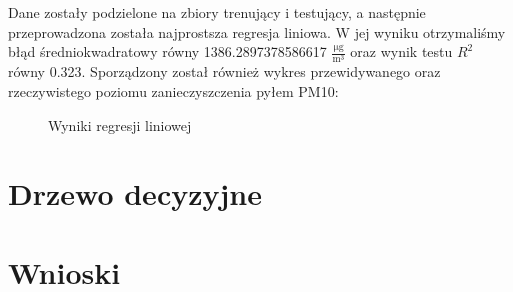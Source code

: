 \documentclass{article}
\begin{document}
	Dane zostały podzielone na zbiory trenujący i testujący, a następnie przeprowadzona została najprostsza regresja liniowa. W jej wyniku otrzymaliśmy błąd średniokwadratowy równy 1386.2897378586617 $\frac{\si{\micro\gram}}{\si\meter^3}$ oraz wynik testu $R^2$ równy 0.323. Sporządzony został również wykres przewidywanego oraz rzeczywistego poziomu zanieczyszczenia pyłem PM10:
	\begin{figure}[!ht]
		\centering
		\caption{Wyniki regresji liniowej}
	\end{figure}
	\FloatBarrier
	\section{Drzewo decyzyjne}
	\section{Wnioski}
	
\end{document}
